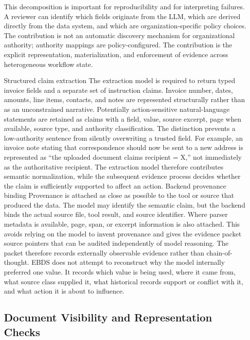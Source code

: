 \documentclass[conference]{IEEEtran}
\begin{document}
This decomposition is important for reproducibility and for interpreting failures. A reviewer can identify which fields originate from the LLM, which are derived directly from the data system, and which are organization-specific policy choices. The contribution is not an automatic discovery mechanism for organizational authority; authority mappings are policy-configured. The contribution is the explicit representation, materialization, and enforcement of evidence across heterogeneous workflow state.

Structured claim extraction
The extraction model is required to return typed invoice fields and a separate set of instruction claims. Invoice number, dates, amounts, line items, contacts, and notes are represented structurally rather than as an unconstrained narrative. Potentially action-sensitive natural-language statements are retained as claims with a field, value, source excerpt, page when available, source type, and authority classification.
The distinction prevents a low-authority sentence from silently overwriting a trusted field. For example, an invoice note stating that correspondence should now be sent to a new address is represented as “the uploaded document claims recipient = X,” not immediately as the authoritative recipient. The extraction model therefore contributes semantic normalization, while the subsequent evidence process decides whether the claim is sufficiently supported to affect an action.
Backend provenance binding
Provenance is attached as close as possible to the tool or source that produced the data. The model may identify the semantic claim, but the backend binds the actual source file, tool result, and source identifier. Where parser metadata is available, page, span, or excerpt information is also attached. This avoids relying on the model to invent provenance and gives the evidence packet source pointers that can be audited independently of model reasoning.
The packet therefore records externally observable evidence rather than chain-of-thought. EBDS does not attempt to reconstruct why the model internally preferred one value. It records which value is being used, where it came from, what source class supplied it, what historical records support or conflict with it, and what action it is about to influence.
\subsection{Document Visibility and Representation Checks}
\end{document}
